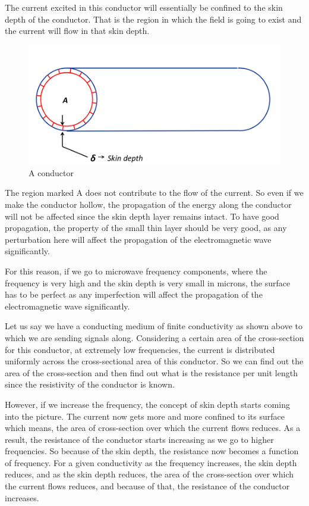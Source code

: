 The current excited in this conductor will essentially be confined to the skin depth of the conductor. That is the region in which the field is going to exist and the current will flow in that skin depth.
\begin{figure}[h]
\centering
\includegraphics[width=1\linewidth]{./graphics/skin_depth}
\caption{A conductor}
\end{figure}

The region marked A does not contribute to the flow of the current. So even if we make the conductor hollow, the propagation of the energy along the conductor will not be affected since the skin depth layer remains intact. To have good propagation, the property of the small thin layer should be very good, as any perturbation here will affect the propagation of the electromagnetic wave significantly.

For this reason, if we go to microwave frequency components, where the frequency is very high and the skin depth is very small in microns, the surface has to be perfect as any imperfection will affect the propagation of the electromagnetic wave significantly.

Let us say we have a conducting medium of finite conductivity as shown above to which we are sending signals along. Considering a certain area of the cross-section for this conductor, at extremely low frequencies, the current is distributed uniformly across the cross-sectional area of this conductor. So we can find out the area of the cross-section and then find out what is the resistance per unit length since the resistivity of the conductor is known.

However, if we increase the frequency, the concept of skin depth starts coming into the picture. The current now gets more and more confined to its surface which means, the area of cross-section over which the current flows reduces. As a result, the resistance of the conductor starts increasing as we go to higher frequencies. So because of the skin depth, the resistance now becomes a function of frequency. For a given conductivity as the frequency increases, the skin depth reduces, and as the skin depth reduces, the area of the cross-section over which the current flows reduces, and because of that, the resistance of the conductor increases.

